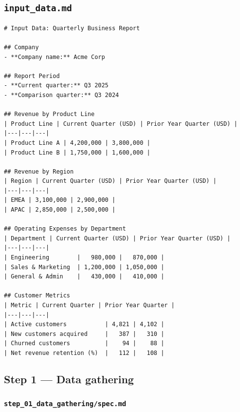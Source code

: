 \documentclass[12pt, a4paper]{article}
\begin{document}
\subsection{\texttt{input\_data.md}}

\begin{lstlisting}[language={}]
# Input Data: Quarterly Business Report

## Company
- **Company name:** Acme Corp

## Report Period
- **Current quarter:** Q3 2025
- **Comparison quarter:** Q3 2024

## Revenue by Product Line
| Product Line | Current Quarter (USD) | Prior Year Quarter (USD) |
|---|---|---|
| Product Line A | 4,200,000 | 3,800,000 |
| Product Line B | 1,750,000 | 1,600,000 |

## Revenue by Region
| Region | Current Quarter (USD) | Prior Year Quarter (USD) |
|---|---|---|
| EMEA | 3,100,000 | 2,900,000 |
| APAC | 2,850,000 | 2,500,000 |

## Operating Expenses by Department
| Department | Current Quarter (USD) | Prior Year Quarter (USD) |
|---|---|---|
| Engineering        |   980,000 |   870,000 |
| Sales & Marketing  | 1,200,000 | 1,050,000 |
| General & Admin    |   430,000 |   410,000 |

## Customer Metrics
| Metric | Current Quarter | Prior Year Quarter |
|---|---|---|
| Active customers           | 4,821 | 4,102 |
| New customers acquired     |   387 |   310 |
| Churned customers          |    94 |    88 |
| Net revenue retention (%)  |   112 |   108 |
\end{lstlisting}

\subsection{Step 1 --- Data gathering}

\subsubsection{\texttt{step\_01\_data\_gathering/spec.md}}
\end{document}
